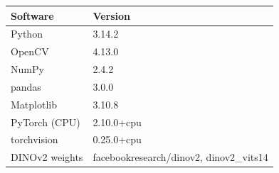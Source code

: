 \begin{tabular}{ll}
\toprule
Software & Version \\
\midrule
Python & 3.14.2 \\
OpenCV & 4.13.0 \\
NumPy & 2.4.2 \\
pandas & 3.0.0 \\
Matplotlib & 3.10.8 \\
PyTorch (CPU) & 2.10.0+cpu \\
torchvision & 0.25.0+cpu \\
DINOv2 weights & facebookresearch/dinov2, dinov2\_vits14 \\
\bottomrule
\end{tabular}
